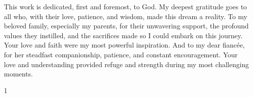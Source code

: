 \maketitle

\begin{itadedication}
	
This work is dedicated, first and foremost, to God. My deepest gratitude goes to all who, with their love, patience, and wisdom, made this dream a reality. To my beloved family, especially my parents, for their unwavering support, the profound values they instilled, and the sacrifices made so I could embark on this journey. Your love and faith were my most powerful inspiration. And to my dear fiancée, for her steadfast companionship, patience, and constant encouragement. Your love and understanding provided refuge and strength during my most challenging moments.

\end{itadedication}

\begin{itathanks}
	
\end{itathanks}

\thispagestyle{empty}
\ifhyperref{}\fi
\begin{flushright}
	\begin{spacing}{1}
		\mbox{}\vfill
		
	\end{spacing}
\end{flushright}

\begin{abstract}
	\noindent
	
\end{abstract}

\begin{englishabstract}
	\noindent
	
\end{englishabstract}

\listoffigures %

\listoftables %

\listofabbreviations

\listofsymbols

\tableofcontents
